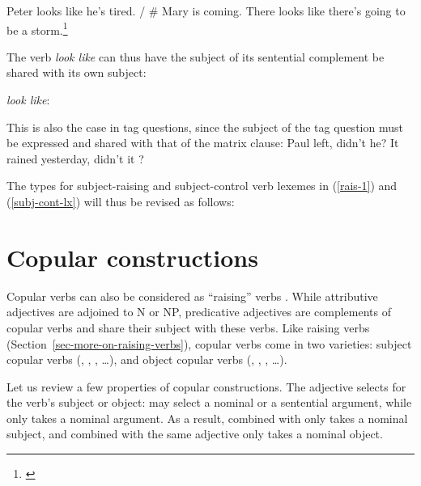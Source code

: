 \eal
\ex Peter looks like he's tired. / \# Mary is coming.
\ex There looks like there's going to be a storm.\footnote{
\citet[]{Sag2007a}
}
\zl

The verb \emph{look like} can thus have the subject of its sentential complement  be shared with its
own subject:

\ea
\emph{look like}:\\
\avm{
[ \argst < \1, S[xarg & \1] > ]}
\z

This is also the case in  tag questions, since the subject of the tag question must be
expressed and shared with that of the matrix clause:
\eal
\ex Paul left, didn't he?
\ex It rained yesterday, didn't it ?
\zl


The types for subject-raising and subject-control verb lexemes in (\ref{rais-1}) and (\ref{subj-cont-lx}) will thus be revised as follows:\\
\eal
\ex {}  \impl \avm{ [\argst \1 \+ < [x-arg & \1 ] > ] } 
\ex {} \impl {}
\zl

\section{Copular constructions}
\label{sec-copular-constructions}

Copular verbs can also be considered as ``raising'' verbs \citep[]{Chomsky81a}.  While
attributive adjectives are adjoined to N or NP, predicative adjectives are complements of copular
verbs and share their subject with these verbs. Like raising verbs
(Section~\ref{sec-more-on-raising-verbs}), copular verbs come in two varieties: subject copular
verbs (, , , \ldots), and object copular verbs (,
, , \ldots).

Let us review a few properties of copular constructions.
The adjective selects for the verb's subject or object:  may select a nominal or a
sentential argument, while  only takes a nominal argument. As a result, 
combined with  only takes a nominal subject, and  combined with the
same adjective only takes a nominal object. 


